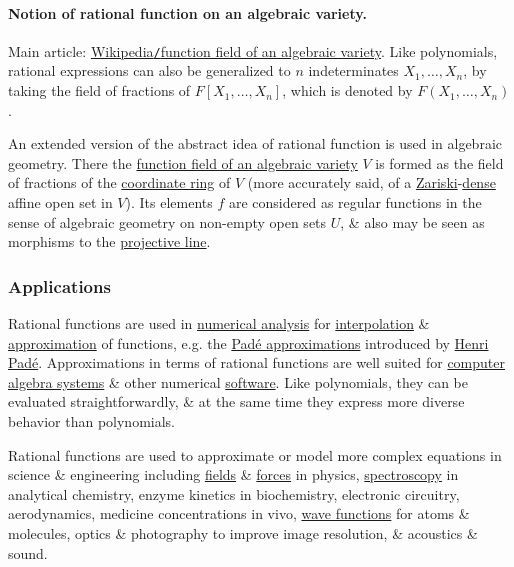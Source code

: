 \documentclass{article}
\begin{document}
\paragraph{Notion of rational function on an algebraic variety.} Main article: \href{https://en.wikipedia.org/wiki/Function_field_of_an_algebraic_variety}{Wikipedia{\tt/}function field of an algebraic variety}. Like polynomials, rational expressions can also be generalized to $n$ indeterminates $X_1,\ldots,X_n$, by taking the field of fractions of $F[X_1,\ldots,X_n]$, which is denoted by $F(X_1,\ldots,X_n)$.

An extended version of the abstract idea of rational function is used in algebraic geometry. There the \href{https://en.wikipedia.org/wiki/Function_field_of_an_algebraic_variety}{function field of an algebraic variety} $V$ is formed as the field of fractions of the \href{https://en.wikipedia.org/wiki/Coordinate_ring}{coordinate ring} of $V$ (more accurately said, of a \href{https://en.wikipedia.org/wiki/Zariski_topology}{Zariski}-\href{https://en.wikipedia.org/wiki/Dense_subset}{dense} affine open set in $V$). Its elements $f$ are considered as regular functions in the sense of algebraic geometry on non-empty open sets $U$, \& also may be seen as morphisms to the \href{https://en.wikipedia.org/wiki/Projective_line}{projective line}.

\subsubsection{Applications}
Rational functions are used in \href{https://en.wikipedia.org/wiki/Numerical_analysis}{numerical analysis} for \href{https://en.wikipedia.org/wiki/Interpolation}{interpolation} \& \href{https://en.wikipedia.org/wiki/Approximation}{approximation} of functions, e.g. the \href{https://en.wikipedia.org/wiki/Pad%C3%A9_approximation}{Pad\'e approximations} introduced by \href{https://en.wikipedia.org/wiki/Henri_Pad%C3%A9}{\sc Henri Pad\'e}. Approximations in terms of rational functions are well suited for \href{https://en.wikipedia.org/wiki/Computer_algebra_system}{computer algebra systems} \& other numerical \href{https://en.wikipedia.org/wiki/Software}{software}. Like polynomials, they can be evaluated straightforwardly, \& at the same time they express more diverse behavior than polynomials.

Rational functions are used to approximate or model more complex equations in science \& engineering including \href{https://en.wikipedia.org/wiki/Field_(physics)}{fields} \& \href{https://en.wikipedia.org/wiki/Force}{forces} in physics, \href{https://en.wikipedia.org/wiki/Spectroscopy}{spectroscopy} in analytical chemistry, enzyme kinetics in biochemistry, electronic circuitry, aerodynamics, medicine concentrations in vivo, \href{https://en.wikipedia.org/wiki/Wave_function}{wave functions} for atoms \& molecules, optics \& photography to improve image resolution, \& acoustics \& sound.
\end{document}
